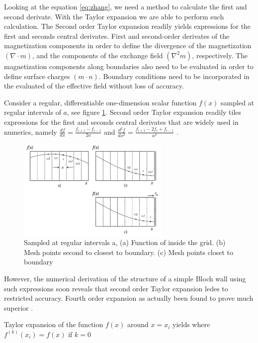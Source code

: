 Looking at the equation \ref{eq:zhang}, we need a method to calculate the first and second derivate. With the Taylor expansion we are able to perform such calculation. The Second order Taylor expansion readily yields expressions for the first and seconds central derivates. First and second-order derivates of the magnetization components in order to define the divergence  of the magnetization $(\nabla \cdot m)$, and the components of the exchange field $(\nabla^2m)$, respectively. The magnetization components along boundaries also need to be evaluated in order to define surface charges $(m \cdot n)$. Boundary conditions need to be incorporated in the evaluated of the effective field without loss of accuracy. 

Consider a regular, differentiable one-dimension scalar function $f(x)$ sampled at regular intervals of $a$, see figure  \ref{fig:bound}. Second order Taylor expansion readily tiles expressions for the first and seconds central derivates that are widely used in numerics, namely $\frac{df}{dx} = \frac{f_{i+1} - f_{i-1}}{2a}$ and $\frac{d^2f}{dx^2} = \frac{f_{i+1} - 2f_i + f_{i-1}}{a^2}$ \cite{methods}.

\begin{figure}[htbp]
	\centering
		\includegraphics[width=0.65\textwidth]{Figures/bound.png}
		\smallskip
	\caption[Sampled at regular intervals a, Taylor expansion]{Sampled at regular intervals a, (a) Function of inside the grid. (b) Mesh points second to closest to boundary. (c) Mesh points closet to boundary}
	\label{fig:bound}
\end{figure}

However, the numerical derivation of the structure of a simple Bloch wall using such expressions soon reveals that second order Taylor expansion ledes to restricted accuracy. Fourth order expansion as actually been found to prove much superior \cite{methods}.

Taylor expansion of the function $f(x)$ around $x=x_i$ yields where $f^{(k)}(x_i) = f(x)$ if $k=0$

